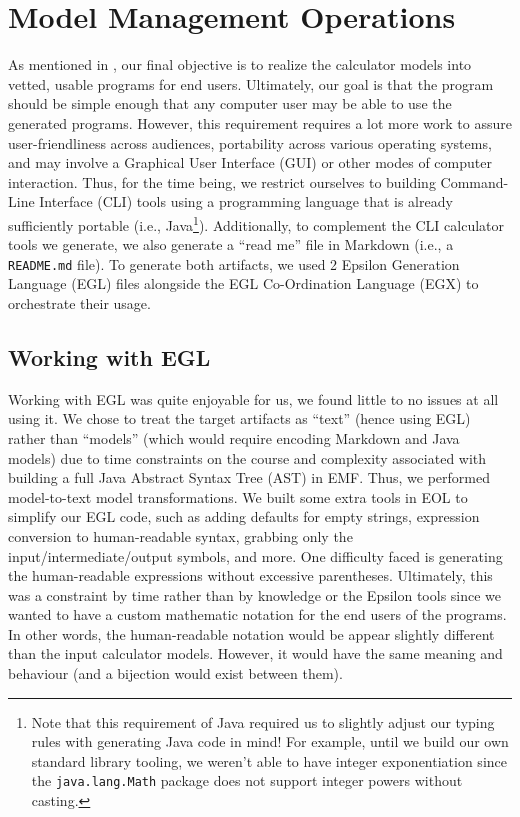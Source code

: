 \documentclass[11pt,fleqn]{article}
\begin{document}
\newpage{}

\section{Model Management Operations}
\label{sec:model-management-operations}

As mentioned in , our final objective is
to realize the calculator models into vetted, usable programs for end users.
Ultimately, our goal is that the program should be simple enough that any
computer user may be able to use the generated programs. However, this
requirement requires a lot more work to assure user-friendliness across
audiences, portability across various operating systems, and may involve a
Graphical User Interface (GUI) or other modes of computer interaction. Thus, for
the time being, we restrict ourselves to building Command-Line Interface (CLI)
tools using a programming language that is already sufficiently portable (i.e.,
Java\footnote{Note that this requirement of Java required us to slightly adjust
our typing rules with generating Java code in mind! For example, until we build
our own standard library tooling, we weren't able to have integer exponentiation
since the \lstinline{java.lang.Math} package does not support integer powers
without casting.}). Additionally, to complement the CLI calculator tools we
generate, we also generate a ``read me'' file in Markdown (i.e., a
\lstinline{README.md} file). To generate both artifacts, we used 2 Epsilon
Generation Language (EGL) files alongside the EGL Co-Ordination Language (EGX)
to orchestrate their usage.

\subsection{Working with EGL}
\label{sec:model-management-operations:subsec:working-with-egl}

Working with EGL was quite enjoyable for us, we found little to no issues at all
using it. We chose to treat the target artifacts as ``text'' (hence using EGL)
rather than ``models'' (which would require encoding Markdown and Java models)
due to time constraints on the course and complexity associated with building a
full Java Abstract Syntax Tree (AST) in EMF. Thus, we performed model-to-text
model transformations. We built some extra tools in EOL to simplify our EGL
code, such as adding defaults for empty strings, expression conversion to
human-readable syntax, grabbing only the input/intermediate/output symbols, and
more. One difficulty faced is generating the human-readable expressions without
excessive parentheses. Ultimately, this was a constraint by time rather than by
knowledge or the Epsilon tools since we wanted to have a custom mathematic
notation for the end users of the programs. In other words, the human-readable
notation would be appear slightly different than the input calculator models.
However, it would have the same meaning and behaviour (and a bijection would
exist between them).
\end{document}

